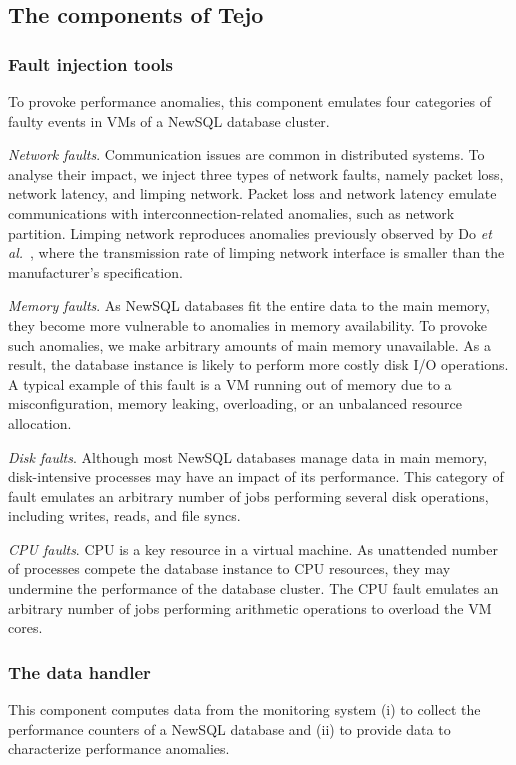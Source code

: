 \subsection{The components of Tejo}
\label{subsec:tejo_components}

\subsubsection{Fault injection tools} 
To provoke performance anomalies, this component emulates four categories of faulty events in VMs of a NewSQL database cluster. 

\emph{Network faults}. Communication issues are common in distributed systems. To analyse their impact, we inject three types of network faults, namely packet loss, network latency, and limping network. Packet loss and network latency emulate communications with interconnection-related anomalies, such as network partition. Limping network reproduces anomalies previously observed by Do \emph{et al.}~\cite{do2013limplock}, where the transmission rate of limping network interface is smaller than the manufacturer's specification. 

\emph{Memory faults}. As NewSQL databases fit the entire data to the main memory, they become more vulnerable to anomalies in memory availability. To provoke such anomalies, we make arbitrary amounts of main memory unavailable. As a result, the database instance is likely to perform more costly disk I/O operations. A typical example of this fault is a VM running out of memory due to a misconfiguration, memory leaking, overloading, or an unbalanced resource allocation.

\emph{Disk faults}. Although most NewSQL databases manage data in main memory, disk-intensive processes may have an impact of its performance. This category of fault emulates an arbitrary number of jobs performing several disk operations, including writes, reads, and file syncs.  

\emph{CPU faults}. CPU is a key resource in a virtual machine. As unattended number of processes compete the database instance to CPU resources, they may undermine the performance of the database cluster. The CPU fault emulates an arbitrary number of jobs performing arithmetic operations to overload the VM cores. 


\subsubsection{The data handler} 
This component computes data from the monitoring system (i) to collect the performance counters of a NewSQL database and (ii) to provide data to characterize performance anomalies.

